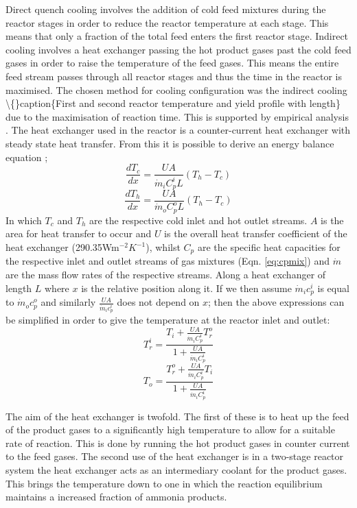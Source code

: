 \documentclass[11pt, a4paper]{article}
\begin{document}
{
Direct quench cooling involves the addition of cold feed mixtures during the reactor stages in order to reduce the reactor temperature at each stage. This means that only a fraction of the total feed enters the first reactor stage.
Indirect cooling involves a heat exchanger passing the hot product gases past the cold feed gases in order to raise the temperature of the feed gases. This means the entire feed stream passes through all reactor stages and thus the time in the reactor is maximised.
The chosen method for cooling configuration was the indirect cooling \textbackslash\{\}caption\{First and second reactor temperature and yield profile with length\} due to the maximisation of reaction time. This is supported by empirical analysis \cite{Penkuhn2017}. The heat exchanger used in the reactor is a counter-current heat exchanger with steady state heat transfer. From this it is possible to derive an energy balance equation \cite{Jinasena2016};
\begin{equation}
\frac{dT_c}{dx}=\frac{UA}{\dot m_i C^i_pL}(T_h-T_c)  
\end{equation}
\begin{equation}
\frac{dT_h}{dx}=\frac{UA}{\dot m_o C^o_pL}(T_h-T_c)
\end{equation}
In which $T_c$ and $T_h$ are the respective cold inlet and hot outlet streams. $A$ is the area for heat transfer to occur and $U$ is the overall heat transfer coefficient of the heat exchanger (290.35Wm$^{-2}K^{-1}$)\cite{Elnashaie1988}, whilst $C_p$ are the specific heat capacities for the respective inlet and outlet streams of gas mixtures (Eqn. \ref{eq:cpmix}) and $\dot m$ are the mass flow rates of the respective streams. Along a heat exchanger of length $L$ where $x$ is the relative position along it. If we then assume $\dot m_i c^i_p$ is equal to $\dot m_o c^o_p$ and similarly $\frac{UA}{\dot m_i c^i_p}$ does not depend on $x$; then the above expressions can be simplified in order to give the temperature at the reactor inlet and outlet:
\begin{equation}
T_r^i = \frac{T_i + \frac{UA}{\dot m_i C^i_p}T_r^o}{1+\frac{UA}{\dot m_i C^i_p}}
\end{equation}
\begin{equation}
T_o = \frac{T_r^o + \frac{UA}{\dot m_i C^i_p}T_i}{1+\frac{UA}{\dot m_i C^i_p}}
\end{equation}

The aim of the heat exchanger is twofold. The first of these is to heat up the feed of the product gases to a significantly high temperature to allow for a suitable rate of reaction. This is done by running the hot product gases in counter current to the feed gases. The second use of the heat exchanger is in a two-stage reactor system the heat exchanger acts as an intermediary coolant for the product gases. This brings the temperature down to one in which the reaction equilibrium maintains a increased fraction of ammonia products.

}
\end{document}
